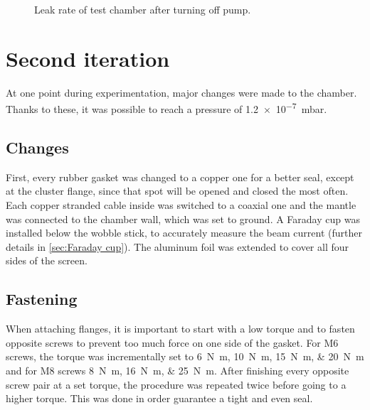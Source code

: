 \begin{figure}[ht]
	\centering
		
	\begin{tikzpicture}
		
	\end{tikzpicture}
	
	\caption{Leak rate of test chamber after turning off pump.}
	\label{fig:Leak rate of test chamber after turning off pump}
\end{figure}


\section{Second iteration}
\label{sec:Second iteration}

At one point during experimentation, major changes were made to the chamber. Thanks to these, it was possible to reach a pressure of \SI{1.2e-7}{\milli\bar}.

\subsection{Changes}
\label{subsec:Changes}

First, every rubber gasket was changed to a copper one for a better seal, except at the cluster flange, since that spot will be opened and closed the most often. Each copper stranded cable inside was switched to a coaxial one and the mantle was connected to the chamber wall, which was set to ground. A Faraday cup was installed below the wobble stick, to accurately measure the beam current (further details in \cref{sec:Faraday cup}). The aluminum foil was extended to cover all four sides of the screen.

\subsection{Fastening}
\label{subsec:Fastening}

When attaching flanges, it is important to start with a low torque and to fasten opposite screws to prevent too much force on one side of the gasket. For M6 screws, the torque was incrementally set to \SIlist{6;10;15;20}{\newton\meter} and for M8 screws \SIlist{8;16;25}{\newton\meter}. After finishing every opposite screw pair at a set torque, the procedure was repeated twice before going to a higher torque. This was done in order guarantee a tight and even seal.